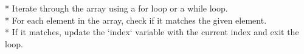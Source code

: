 \documentclass[preview]{standalone}
\begin{document}
* Iterate through the array using a for loop or a while loop.\\* For each element in the array, check if it matches the given element.\\* If it matches, update the `index` variable with the current index and exit the loop.\\
\end{document}
